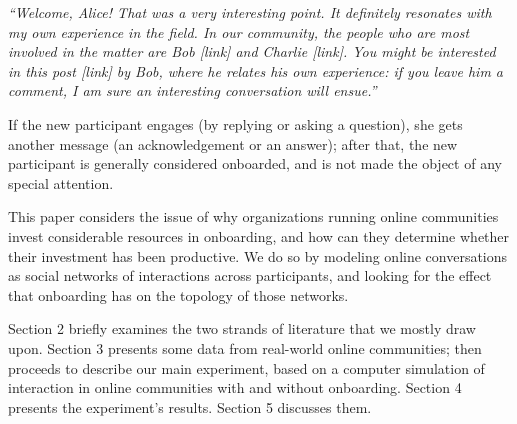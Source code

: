 \emph{``Welcome, Alice! That was a very interesting point. It definitely resonates with my own experience in the field. In our community, the people who are most involved in the matter are Bob [link] and Charlie [link]. You might be interested in this post [link] by Bob, where he relates his own experience: if you leave him a comment, I am sure an interesting conversation will ensue.''}

If the new participant engages (by replying or asking a question), she gets another message (an acknowledgement or an answer); after that, the new participant is generally considered onboarded, and is not made the object of any special attention.

This paper considers the issue of why organizations running online communities invest considerable resources in onboarding, and how can they determine whether their investment has been productive. We do so by modeling online conversations as social networks of interactions across participants, and looking for the effect that onboarding has on the topology of those networks.

Section 2 briefly examines the two strands of literature that we mostly draw upon. Section 3 presents some data from real-world online communities; then proceeds to describe our main experiment, based on a computer simulation of interaction in online communities with and without onboarding. Section 4 presents the experiment's results. Section 5 discusses them.

